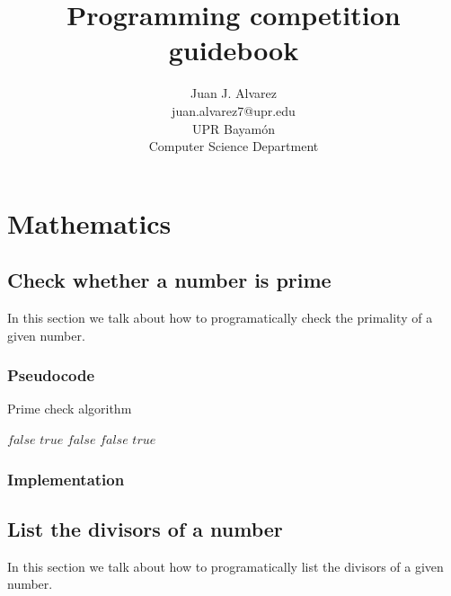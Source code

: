 \documentclass[letterpaper]{article}
\title{Programming competition guidebook}
\author{
  Juan J. Alvarez \\
  juan.alvarez7@upr.edu \\
  UPR Bayam\'{o}n \\
  Computer Science Department
}
\date{}
\begin{document}
  \maketitle

  \tableofcontents

  \newpage

  \section{Mathematics}

    \subsection{Check whether a number is prime}
      In this section we talk about how to programatically check the primality of a given number.

      \subsubsection{Pseudocode}
        \begin{algorithm}
          \caption{Prime check algorithm}
          \begin{algorithmic}[1]
                \Return $false$
              \EndIf
                \Return $true$
              \EndIf
                \Return $false$
              \EndIf
                  \Return $false$
                \EndIf
              \EndFor
              \Return $true$
            \EndProcedure
          \end{algorithmic}
        \end{algorithm}

      \subsubsection{Implementation}
        

    \subsection{List the divisors of a number}
      In this section we talk about how to programatically list the divisors of a given number.
\end{document}
